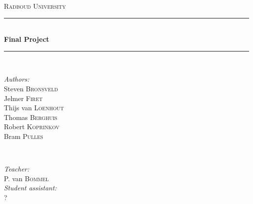 \documentclass[main.tex]{subfiles}
\begin{document}
\begin{titlepage}
    \newcommand{\HRule}{\rule{\linewidth}{0.5mm}} 

    \center 
    \textsc{\LARGE Radboud University}\\[0.5cm] 

    \HRule \\[0.4cm]
        {\huge \bfseries Final Project}\\[0.3cm] 
    \HRule \\[1.5cm]

    \begin{figure}[ht]
     	\centering
    \end{figure}

    \begin{minipage}{0.4\textwidth}
        \begin{flushleft} \large
            \emph{Authors:}\\
            Steven \textsc{Bronsveld} \\
            Jelmer \textsc{Firet} \\
            Thijs van \textsc{Loenhout} \\
            Thomas \textsc{Berghuis} \\
            Robert \textsc{Koprinkov} \\
            Bram \textsc{Pulles} \\
        \end{flushleft}
    \end{minipage}
    ~
    \begin{minipage}{0.4\textwidth}
        \begin{flushright} \large
            \emph{Teacher:} \\
            P. van \textsc{Bommel} \\
            \emph{Student assistant:} \\
            ? 
        \end{flushright}
    \end{minipage}\\[2cm]

    \vfill 

\end{titlepage}
\end{document}

